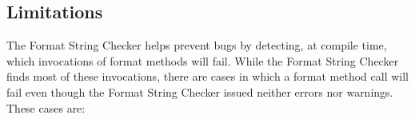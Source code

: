 % 
% 
% 
% 

\subsection{Limitations\label{formatter-limitations}}

The Format String Checker helps prevent bugs by detecting, at compile time,
which invocations of format methods will fail. While the Format String Checker
finds most of these invocations, there are cases in which a format method call
will fail even though the Format String Checker issued neither errors nor
warnings. These cases are:

